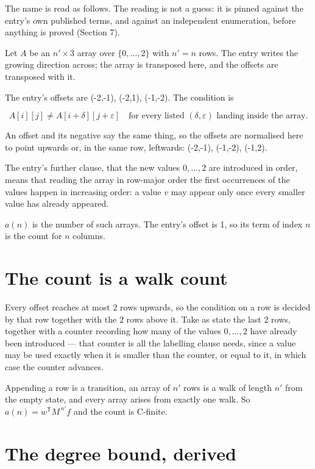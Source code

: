 \documentclass[11pt]{article}
\theoremstyle{definition}
\begin{document}
The name is read as follows. The reading is not a guess: it is pinned against the entry's own published terms, and against an independent enumeration, before anything is proved (Section 7).

Let $A$ be an $n' \times 3$ array over $\{0,\dots,2\}$ with $n' = n$ rows. The entry writes the growing direction across; the array is transposed here, and the offsets are transposed with it.

The entry's offsets are (-2,-1), (-2,1), (-1,-2). The condition is

\[A[i][j] \ne A[i{+}\delta][j{+}\varepsilon]\quad\text{for every listed }(\delta,\varepsilon)\text{ landing inside the array.}\]

An offset and its negative say the same thing, so the offsets are normalised here to point upwards or, in the same row, leftwards: (-2,-1), (-1,-2), (-1,2).

The entry's further clause, that the new values $0,\dots,2$ are introduced in order, means that reading the array in row-major order the first occurrences of the values happen in increasing order: a value $v$ may appear only once every smaller value has already appeared.

$a(n)$ is the number of such arrays. The entry's offset is 1, so its term of index $n$ is the count for $n$ columns.

\section{The count is a walk count}

Every offset reaches at most $2$ rows upwards, so the condition on a row is decided by that row together with the $2$ rows above it. Take as state the last $2$ rows, together with a counter recording how many of the values $0,\dots,2$ have already been introduced --- that counter is all the labelling clause needs, since a value may be used exactly when it is smaller than the counter, or equal to it, in which case the counter advances.

Appending a row is a transition, an array of $n'$ rows is a walk of length $n'$ from the empty state, and every array arises from exactly one walk. So $a(n) = w^{\mathsf T}M^{\,n'}f$ and the count is C-finite.

\section{The degree bound, derived}
\end{document}
